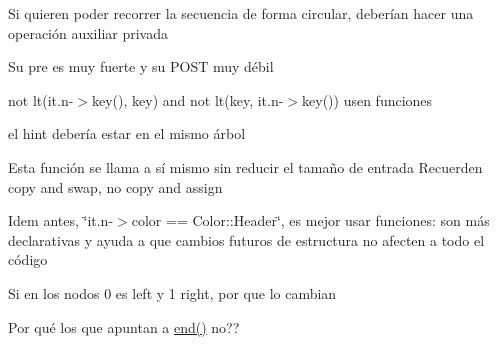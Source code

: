 \begin{DoxyRefList}
Si quieren poder recorrer la secuencia de forma circular, deberían hacer una operación auxiliar privada 
\item[\label{bug__bug000024}%
\hypertarget{bug__bug000024}{}%
Miembro \hyperlink{classaed2_1_1map_1_1iterator_ad052c1ef8477a1613c292202226053a5_ad052c1ef8477a1613c292202226053a5}{aed2\+:\+:map$<$ Key, Meaning, Compare $>$\+:\+:iterator\+:\+:operator==} (iterator other) const ]Su pre es muy fuerte y su P\+O\+ST muy débil 
\item[\label{bug__bug000010}%
\hypertarget{bug__bug000010}{}%
Miembro \hyperlink{classaed2_1_1map_a3399d36fdd5a880b494f3a5795d3f18f_a3399d36fdd5a880b494f3a5795d3f18f}{aed2\+:\+:map$<$ Key, Meaning, Compare $>$\+:\+:lower\+\_\+bound} (const Key \&key) const ]not lt(it.\+n-\/$>$key(), key) and not lt(key, it.\+n-\/$>$key()) usen funciones 
\item[\label{bug__bug000002}%
\hypertarget{bug__bug000002}{}%
Miembro \hyperlink{classaed2_1_1map_a7a77950a3d8e637bfa7cf5dcd904f257_a7a77950a3d8e637bfa7cf5dcd904f257}{aed2\+:\+:map$<$ Key, Meaning, Compare $>$\+:\+:map} (const map \&other)]el hint debería estar en el mismo árbol 
\item[\label{bug__bug000003}%
\hypertarget{bug__bug000003}{}%
Miembro \hyperlink{classaed2_1_1map_ac606d334809066929522964d45e76317_ac606d334809066929522964d45e76317}{aed2\+:\+:map$<$ Key, Meaning, Compare $>$\+:\+:operator=} (map other)]Esta función se llama a sí mismo sin reducir el tamaño de entrada Recuerden copy and swap, no copy and assign 
\item[\label{bug__bug000006}%
\hypertarget{bug__bug000006}{}%
Miembro \hyperlink{classaed2_1_1map_a96f23896164ab47bee48c26b803f9801_a96f23896164ab47bee48c26b803f9801}{aed2\+:\+:map$<$ Key, Meaning, Compare $>$\+:\+:operator\mbox{[}\mbox{]}} (const Key \&key)]Idem antes, \char`\"{}it.\+n-\/$>$color == Color\+::\+Header\char`\"{}, es mejor usar funciones\+: son más declarativas y ayuda a que cambios futuros de estructura no afecten a todo el código 
\item[\label{bug__bug000022}%
\hypertarget{bug__bug000022}{}%
Miembro \hyperlink{classaed2_1_1map_a54b1ea9f8c707232c744a4ac5c5302d2_a54b1ea9f8c707232c744a4ac5c5302d2}{aed2\+:\+:map$<$ Key, Meaning, Compare $>$\+:\+:Rotate} (\hyperlink{structaed2_1_1map_1_1Node}{Node} $\ast$n, int i)]Si en los nodos 0 es left y 1 right, por que lo cambian 
\item[\label{bug__bug000004}%
\hypertarget{bug__bug000004}{}%
Miembro \hyperlink{classaed2_1_1map_ab22c9a85c2dadbc286cd30e97069a8e6_ab22c9a85c2dadbc286cd30e97069a8e6}{aed2\+:\+:map$<$ Key, Meaning, Compare $>$\+:\+:$\sim$map} ()]Por qué los que apuntan a \hyperlink{classaed2_1_1map_a76023e6a56cb625513e1b5ea028bf983_a76023e6a56cb625513e1b5ea028bf983}{end()} no?? 

\end{DoxyRefList}
